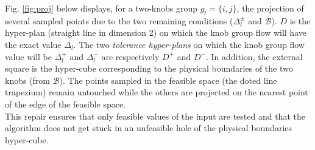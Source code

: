 Fig. \ref{fig:proj} below displays, for a two-knobs group $g_{l}=\{i,j\}$, the projection of several sampled points due to the two remaining conditions ($\Delta_{l}^{\pm}$ and $\mathscr{B}$). $D$ is the hyper-plan (straight line in dimension 2) on which the knob group flow will have the exact value $\Delta_{l}$.
The two \emph{tolerance hyper-plans} on which the knob group flow value will be $\Delta_{l}^{+}$ and $\Delta_{l}^{-}$ are respectively $D^{+}$ and $D^{-}$.
In addition, the external square is the hyper-cube corresponding to the physical boundaries of the two knobs (from $\mathscr{B}$). 
The points sampled in the feasible space (the doted line trapezium) remain untouched while the others are projected on the nearest point of the edge of the feasible space.\\
This repair ensures that only feasible values of the input are tested and that the algorithm does not get stuck in an unfeasible hole of the physical boundaries hyper-cube.\\

